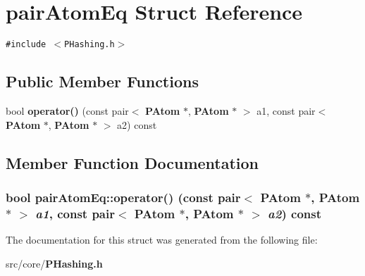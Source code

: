 \section{pair\-Atom\-Eq Struct Reference}
\label{structpairAtomEq}
{\tt \#include $<$PHashing.h$>$}

\subsection*{Public Member Functions}
\begin{CompactItemize}
\item 
bool {\bf operator()} (const pair$<$ {\bf PAtom} $\ast$, {\bf PAtom} $\ast$ $>$ a1, const pair$<$ {\bf PAtom} $\ast$, {\bf PAtom} $\ast$ $>$ a2) const
\end{CompactItemize}


\subsection{Member Function Documentation}
\subsubsection{\setlength{\rightskip}{0pt plus 5cm}bool pair\-Atom\-Eq::operator() (const pair$<$ {\bf PAtom} $\ast$, {\bf PAtom} $\ast$ $>$ {\em a1}, const pair$<$ {\bf PAtom} $\ast$, {\bf PAtom} $\ast$ $>$ {\em a2}) const\hspace{0.3cm}{\tt  [inline]}}\label{structpairAtomEq_e3a7d2db4fc65099b60336a869871732}




The documentation for this struct was generated from the following file:\begin{CompactItemize}
\item 
src/core/{\bf PHashing.h}\end{CompactItemize}
